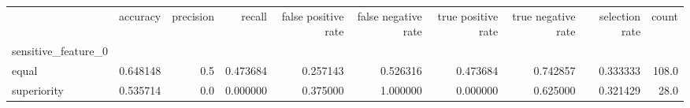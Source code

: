 \begin{tabular}{lrrrrrrrrr}
\toprule
{} &  accuracy &  precision &    recall &  false positive rate &  false negative rate &  true positive rate &  true negative rate &  selection rate &  count \\
sensitive\_feature\_0 &           &            &           &                      &                      &                     &                     &                 &        \\
\midrule
equal               &  0.648148 &        0.5 &  0.473684 &             0.257143 &             0.526316 &            0.473684 &            0.742857 &        0.333333 &  108.0 \\
superiority         &  0.535714 &        0.0 &  0.000000 &             0.375000 &             1.000000 &            0.000000 &            0.625000 &        0.321429 &   28.0 \\
\bottomrule
\end{tabular}
